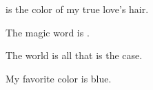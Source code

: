 \begin{questions}
    \question[5] \fillin[Black] is the color of my true love's hair.

    \question[5] The magic word is \fillin[prestidigitator][2in].

    \question \tf[T] The world is all that is the case.

    \question \tf[F] My favorite color is blue.
\end{questions}
